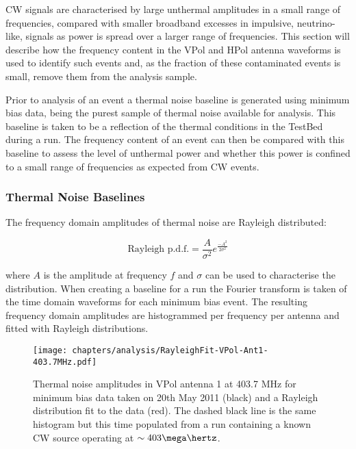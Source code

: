 CW signals are characterised by large unthermal amplitudes in a small range of frequencies, compared with smaller broadband excesses in impulsive, neutrino-like, signals as power is spread over a larger range of frequencies. This section will describe how the frequency content in the VPol and HPol antenna waveforms is used to identify such events and, as the fraction of these contaminated events is small, remove them from the analysis sample.

Prior to analysis of an event a thermal noise baseline is generated using minimum bias data, being the purest sample of thermal noise available for analysis. This baseline is taken to be a reflection of the thermal conditions in the TestBed during a run. The frequency content of an event can then be compared with this baseline to assess the level of unthermal power and whether this power is confined to a small range of frequencies as expected from CW events.

\subsubsection{Thermal Noise Baselines}
\label{sec:Analysis:CWRemoval:Baselines}

The frequency domain amplitudes of thermal noise are Rayleigh distributed:

\begin{equation}
  \mbox{Rayleigh p.d.f.} = \frac{A}{\sigma^{2}}e^{\frac{-A^{2}}{2\sigma^{2}}}
  \label{eq:Analysis:CWRemoval:Rayleigh-pdf}
\end{equation}

\noindent where $A$ is the amplitude at frequency $f$ and $\sigma$ can be used to characterise the distribution. When creating a baseline for a run the Fourier transform is taken of the time domain waveforms for each minimum bias event. The resulting frequency domain amplitudes are histogrammed per frequency per antenna and fitted with Rayleigh distributions.


\begin{figure}[htpb]
  \centering
  \texttt{[image: chapters/analysis/RayleighFit-VPol-Ant1-403.7MHz.pdf]}
  \caption{Thermal noise amplitudes in VPol antenna 1 at 403.7 MHz for minimum bias data taken on 20th May 2011 (black) and a Rayleigh distribution fit to the data (red). The dashed black line is the same histogram but this time populated from a run containing a known CW source operating at $\sim 403 \mega \hertz$.}
  \label{fig:analysis:CWRemoval:Baselines:Rayleigh-Fit}
\end{figure}



